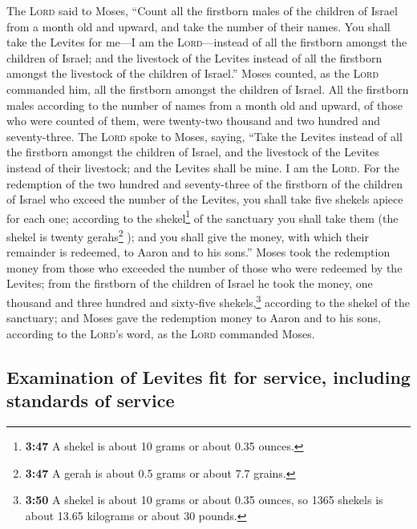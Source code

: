  The \textsc{Lord} said to Moses, ``Count all the
firstborn males of the children of Israel from a month old and upward,
and take the number of their names.  You shall take the
Levites for me---I am the \textsc{Lord}---instead of all the firstborn
amongst the children of Israel; and the livestock of the Levites instead
of all the firstborn amongst the livestock of the children of Israel.''
 Moses counted, as the \textsc{Lord} commanded him, all
the firstborn amongst the children of Israel.  All the
firstborn males according to the number of names from a month old and
upward, of those who were counted of them, were twenty-two thousand and
two hundred and seventy-three.  The \textsc{Lord} spoke
to Moses, saying,  ``Take the Levites instead of all the
firstborn amongst the children of Israel, and the livestock of the
Levites instead of their livestock; and the Levites shall be mine. I am
the \textsc{Lord}.  For the redemption of the two hundred
and seventy-three of the firstborn of the children of Israel who exceed
the number of the Levites,  you shall take five shekels
apiece for each one; according to the shekel\footnote{\textbf{3:47} A
  shekel is about 10 grams or about 0.35 ounces.} of the sanctuary you
shall take them (the shekel is twenty gerahs\footnote{\textbf{3:47} A
  gerah is about 0.5 grams or about 7.7 grains.} );  and
you shall give the money, with which their remainder is redeemed, to
Aaron and to his sons.''  Moses took the redemption money
from those who exceeded the number of those who were redeemed by the
Levites;  from the firstborn of the children of Israel he
took the money, one thousand and three hundred and sixty-five
shekels,\footnote{\textbf{3:50} A shekel is about 10 grams or about 0.35
  ounces, so 1365 shekels is about 13.65 kilograms or about 30 pounds.}
according to the shekel of the sanctuary;  and Moses gave
the redemption money to Aaron and to his sons, according to the
\textsc{Lord}'s word, as the \textsc{Lord} commanded Moses.

\hypertarget{examination-of-levites-fit-for-service-including-standards-of-service}{%
\subsection{Examination of Levites fit for service, including standards
of
service}\label{examination-of-levites-fit-for-service-including-standards-of-service}}

